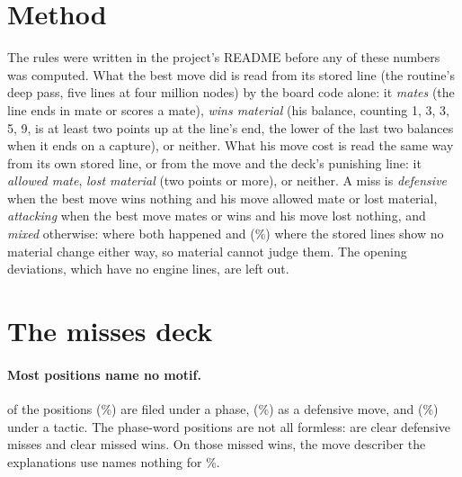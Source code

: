 \documentclass[11pt]{article}
\begin{document}
\section{Method}

The rules were written in the project's README before any of these numbers was computed. What
the best move did is read from its stored line (the routine's deep pass, five lines at four
million nodes) by the board code alone: it \emph{mates} (the line ends in mate or scores a
mate), \emph{wins material} (his balance, counting 1, 3, 3, 5, 9, is at least two points up at
the line's end, the lower of the last two balances when it ends on a capture), or neither. What
his move cost is read the same way from its own stored line, or from the move and the deck's
punishing line: it \emph{allowed mate}, \emph{lost material} (two points or more), or neither.
A miss is \emph{defensive} when the best move wins nothing and his move allowed mate or lost
material, \emph{attacking} when the best move mates or wins and his move lost nothing, and
\emph{mixed} otherwise: \Both{} where both happened and \Neither{} (\NeitherShare\%) where the
stored lines show no material change either way, so material cannot judge them. The
\Deviations{} opening deviations, which have no engine lines, are left out.

\section{The misses deck}

\begin{table}[h]
\centering
\small
\ThemeTable
\caption{The deck's theme words: the learner skill each feeds, how its positions read by the
stored lines, and whether the word clearly fits by the README's rule (defensive move: a
defensive miss; hanging piece and fork: the best move wins or mates; mate words: it mates).
Phase words name no motif and are not scored.}
\end{table}

\paragraph{Most positions name no motif.} \PhaseItems{} of the \Items{} positions
(\PhaseShare\%) are filed under a phase, \DefItems{} (\DefShare\%) as a defensive move, and
\MotifItems{} (\MotifShare\%) under a tactic. The phase-word positions are not all formless:
\PhaseDefensive{} are clear defensive misses and \PhaseAttacking{} clear missed wins. On those
missed wins, the move describer the explanations use names nothing for \PhaseAttackingNothing\%.
\end{document}
